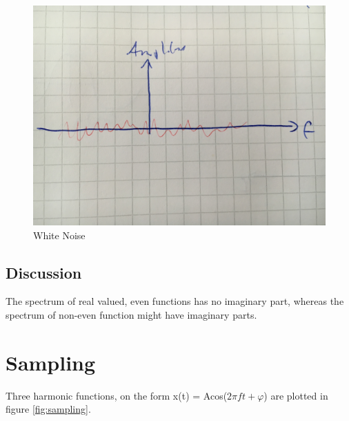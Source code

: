 \documentclass[12pt]{article}
\begin{document}
\begin{figure}[!htbp]
  \centering
  \begin{minipage}[b]{0.45\textwidth}
    \includegraphics[width=\textwidth]{images/white}
    \caption{White Noise}
  \end{minipage}
  \hfill
  \begin{minipage}[b]{0.45\textwidth}
  \end{minipage}
\end{figure}


\subsection{Discussion}
The spectrum of real valued, even functions has no imaginary part, whereas the spectrum of non-even function might have imaginary parts.

\section{Sampling}
Three  harmonic functions, on the form x(t) = Acos($2 \pi ft + \varphi $) are plotted in figure \ref{fig:sampling}.
\end{document}
